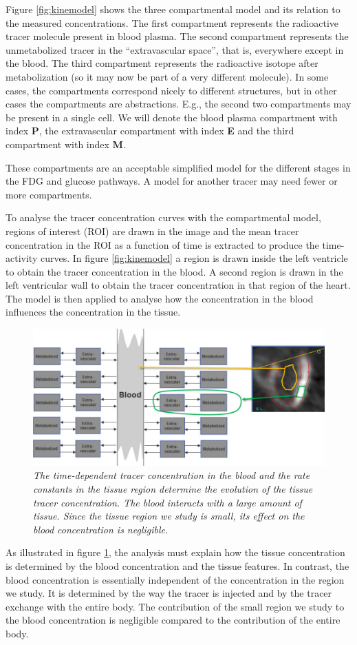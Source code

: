 Figure \ref{fig:kinemodel} shows the three compartmental model and its
relation to the measured concentrations. The first compartment represents the
radioactive tracer molecule present in blood plasma. The second compartment
represents the unmetabolized tracer in the ``extravascular space'', that is,
everywhere except in the blood. The third compartment represents the
radioactive isotope after metabolization (so it may now be part of a very
different molecule). In some cases, the compartments correspond nicely to
different structures, but in other cases the compartments are
abstractions. E.g., the second two compartments may be present in a single
cell. We will denote the blood plasma compartment with index {\bf P}, the
extravascular compartment with index {\bf E} and the third compartment with
index {\bf M}.

These compartments are an acceptable simplified model for the different stages
in the FDG and glucose pathways. A model for another tracer may need fewer or
more compartments.

To analyse the tracer concentration curves with the compartmental
model, regions of interest (ROI) are drawn in the image and the mean
tracer concentration in the ROI as a function of time is extracted to
produce the time-activity curves. In figure \ref{fig:kinemodel} a
region is drawn inside the left ventricle to obtain the tracer
concentration in the blood. A second region is drawn in the left
ventricular wall to obtain the tracer concentration in that region of
the heart. The model is then applied to analyse how the concentration
in the blood influences the concentration in the tissue.
%
\begin{figure}[tb]
\centering
\includegraphics[width=\figbig]{figs/fig_kinemodel2.pdf}
\caption{\label{fig:kinemodel2} \emph{The time-dependent tracer
    concentration in the blood and the rate constants in the tissue
    region determine the evolution of the tissue tracer
    concentration. The blood interacts with a large amount of
    tissue. Since the tissue region we study is small, its effect on
    the blood concentration is negligible.}}
\end{figure}
%
As illustrated in figure \ref{fig:kinemodel2}, the analysis must
explain how the tissue concentration is determined by the blood
concentration and the tissue features. In contrast, the blood
concentration is essentially independent of the concentration in the
region we study. It is determined by the way the tracer is injected
and by the tracer exchange with the entire body. The contribution of
the small region we study to the blood concentration is negligible
compared to the contribution of the entire body.

